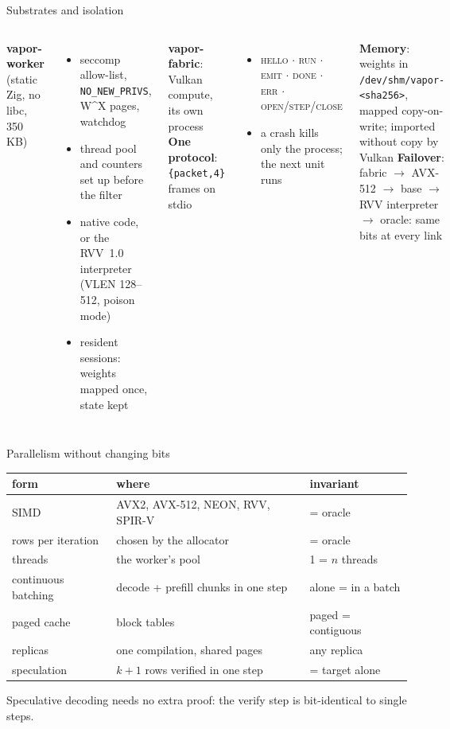 \documentclass[aspectratio=169,11pt]{beamer}
\begin{document}
\begin{frame}{Substrates and isolation}
\begin{columns}[T]
\textbf{vapor-worker} (static Zig, no libc, 350\,KB)
\begin{itemize}\small
\item seccomp allow-list, \texttt{NO\_NEW\_PRIVS}, W\^{}X pages, watchdog
\item thread pool and counters set up before the filter
\item native code, or the RVV~1.0 interpreter (VLEN 128--512, poison mode)
\item resident sessions: weights mapped once, state kept
\end{itemize}
\textbf{vapor-fabric}: Vulkan compute, its own process
\textbf{One protocol}: \texttt{\{packet,4\}} frames on stdio
\begin{itemize}\small
\item \textsc{hello} $\cdot$ \textsc{run} $\cdot$ \textsc{emit} $\cdot$ \textsc{done} $\cdot$ \textsc{err} $\cdot$ \textsc{open}/\textsc{step}/\textsc{close}
\item a crash kills only the process; the next unit runs
\end{itemize}
\textbf{Memory}: weights in \texttt{/dev/shm/vapor-<sha256>}, mapped copy-on-write; imported without copy by Vulkan
\textbf{Failover}: fabric $\to$ AVX-512 $\to$ base $\to$ RVV interpreter $\to$ oracle: same bits at every link
\end{columns}
\end{frame}

\begin{frame}{Parallelism without changing bits}
\small
\begin{tabularx}{\linewidth}{@{}lXl@{}}
\toprule
form & where & invariant \\
\midrule
SIMD & AVX2, AVX-512, NEON, RVV, SPIR-V & = oracle \\
rows per iteration & chosen by the allocator & = oracle \\
threads & the worker's pool & 1 = $n$ threads \\
continuous batching & decode + prefill chunks in one step & alone = in a batch \\
paged cache & block tables & paged = contiguous \\
replicas & one compilation, shared pages & any replica \\
speculation & $k{+}1$ rows verified in one step & = target alone \\
\bottomrule
\end{tabularx}

\vspace{0.6em}
Speculative decoding needs no extra proof: the verify step is bit-identical to single steps.
\end{frame}
\end{document}
